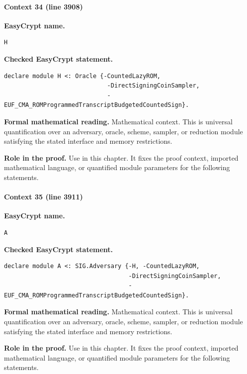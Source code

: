 \paragraph{Context 34 (line 3908)}
\noindent\textbf{EasyCrypt name.}
\begin{lstlisting}[language=EasyCrypt,basicstyle=\ttfamily\scriptsize]
H
\end{lstlisting}
\noindent\textbf{Checked EasyCrypt statement.}
\begin{lstlisting}[language=EasyCrypt,basicstyle=\ttfamily\scriptsize]
declare module H <: Oracle {-CountedLazyROM,
                             -DirectSigningCoinSampler,
                             -EUF_CMA_ROMProgrammedTranscriptBudgetedCountedSign}.
\end{lstlisting}
\noindent\textbf{Formal mathematical reading.}
Mathematical context. This is universal quantification over an adversary, oracle, scheme, sampler, or reduction module satisfying the stated interface and memory restrictions.

\noindent\textbf{Role in the proof.}
Use in this chapter. It fixes the proof context, imported mathematical language, or quantified module parameters for the following statements.

\paragraph{Context 35 (line 3911)}
\noindent\textbf{EasyCrypt name.}
\begin{lstlisting}[language=EasyCrypt,basicstyle=\ttfamily\scriptsize]
A
\end{lstlisting}
\noindent\textbf{Checked EasyCrypt statement.}
\begin{lstlisting}[language=EasyCrypt,basicstyle=\ttfamily\scriptsize]
declare module A <: SIG.Adversary {-H, -CountedLazyROM,
                                   -DirectSigningCoinSampler,
                                   -EUF_CMA_ROMProgrammedTranscriptBudgetedCountedSign}.
\end{lstlisting}
\noindent\textbf{Formal mathematical reading.}
Mathematical context. This is universal quantification over an adversary, oracle, scheme, sampler, or reduction module satisfying the stated interface and memory restrictions.

\noindent\textbf{Role in the proof.}
Use in this chapter. It fixes the proof context, imported mathematical language, or quantified module parameters for the following statements.

